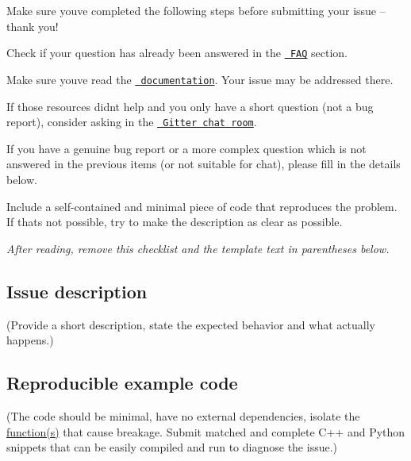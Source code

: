 Make sure you\textquotesingle{}ve completed the following steps before submitting your issue -- thank you!


\begin{DoxyEnumerate}
\item Check if your question has already been answered in the \href{http://pybind11.readthedocs.io/en/latest/faq.html}{\texttt{ F\+AQ}} section.
\item Make sure you\textquotesingle{}ve read the \href{http://pybind11.readthedocs.io/en/latest/}{\texttt{ documentation}}. Your issue may be addressed there.
\item If those resources didn\textquotesingle{}t help and you only have a short question (not a bug report), consider asking in the \href{https://gitter.im/pybind/Lobby}{\texttt{ Gitter chat room}}.
\item If you have a genuine bug report or a more complex question which is not answered in the previous items (or not suitable for chat), please fill in the details below.
\item Include a self-\/contained and minimal piece of code that reproduces the problem. If that\textquotesingle{}s not possible, try to make the description as clear as possible.
\end{DoxyEnumerate}

{\itshape After reading, remove this checklist and the template text in parentheses below.}

\subsection*{Issue description}

(Provide a short description, state the expected behavior and what actually happens.)

\subsection*{Reproducible example code}

(The code should be minimal, have no external dependencies, isolate the \mbox{\hyperlink{classfunction}{function(s)}} that cause breakage. Submit matched and complete C++ and Python snippets that can be easily compiled and run to diagnose the issue.) 